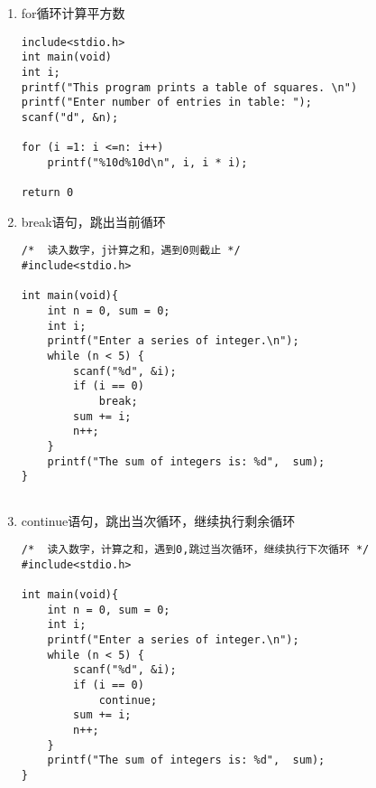 \documentclass{article}
\begin{document}
\begin{enumerate}
\begin{lstlisting}
    do {
        n /= 10;
        digits++;
    } while(n > 0);

    printf("The number has %d digit(s).\n", digits);

    return 0;
}
                \end{lstlisting}

            \subsection*{for语句}
            \item for循环计算平方数
            \begin{lstlisting}
include<stdio.h>
int main(void)
int i;
printf("This program prints a table of squares. \n")
printf("Enter number of entries in table: ");
scanf("d", &n);

for (i =1: i <=n: i++)
    printf("%10d%10d\n", i, i * i);

return 0
            \end{lstlisting}

            \item break语句，跳出当前循环
            
            \begin{lstlisting}
/*  读入数字，j计算之和，遇到0则截止 */
#include<stdio.h>

int main(void){
    int n = 0, sum = 0;
    int i;
    printf("Enter a series of integer.\n");
    while (n < 5) {
        scanf("%d", &i);
        if (i == 0)
            break;
        sum += i;
        n++;
    }
    printf("The sum of integers is: %d",  sum);   
}               
            
            \end{lstlisting}
            
            \item continue语句，跳出当次循环，继续执行剩余循环
            
            \begin{lstlisting}
/*  读入数字，计算之和，遇到0,跳过当次循环，继续执行下次循环 */
#include<stdio.h>

int main(void){
    int n = 0, sum = 0;
    int i;
    printf("Enter a series of integer.\n");
    while (n < 5) {
        scanf("%d", &i);
        if (i == 0)
            continue;
        sum += i;
        n++;
    }
    printf("The sum of integers is: %d",  sum);   
}
            \end{lstlisting}
            
    
\end{enumerate}
\end{document}
